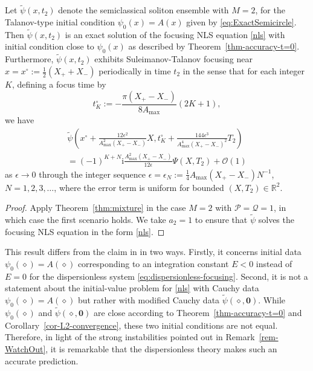 \documentclass[12pt]{amsart}
\numberwithin{equation}{section}
\newcommand{\ii}{\mathrm{i}}
\newcommand{\eps}{\epsilon}
\newcommand{\bigo}[1]{ \mathcal{O}\! \left( #1 \right) }
\begin{document}
\begin{cor}
Let $\widetilde{\psi}(x,t_2)$ denote the semiclassical soliton ensemble with $M=2$, for the Talanov-type initial condition $\psi_0(x)=A(x)$ given by \eqref{eq:ExactSemicircle}.  Then $\widetilde{\psi}(x,t_2)$ is an exact solution of the focusing NLS equation \eqref{nls} with initial condition close to $\psi_0(x)$ as described by Theorem~\ref{thm-accuracy-t=0}.  Furthermore, $\widetilde{\psi}(x,t_2)$ exhibits Suleimanov-Talanov focusing near $x=x^\circ:=\frac{1}{2}(X_++X_-)$ periodically in time $t_2$ in the sense that for each integer $K$, defining a focus time by
\begin{equation}
t_K^\circ:=-\frac{\pi(X_+-X_-)}{8A_\mathrm{max}}(2K+1),
\end{equation}
we have
\begin{multline}
\widetilde{\psi}\left(x^\circ+\frac{12\eps^2}{A_\mathrm{max}^2(X_+-X_-)}X, t_K^\circ+ \frac{144\epsilon^3}{A_\mathrm{max}^4(X_+-X_-)^2}T_2\right)\\=(-1)^{K+N} \ii \frac{A_\mathrm{max}^2(X_+-X_-)}{12\eps}\Psi(X,T_2) + \bigo{1}
\label{eq:cor.Talanov.coords}
\end{multline}
as $\eps\to 0$ through the integer sequence $\eps=\eps_N:=\frac{1}{4}A_\mathrm{max}(X_+-X_-)N^{-1}$, $N=1,2,3,\dots$, where the error term is uniform for bounded $(X,T_2)\in\mathbb{R}^2$.
\label{cor:Talanov}
\end{cor}
\begin{proof}
Apply Theorem~\ref{thm:mixture} in the case $M=2$ with $\mathcal{P}=\mathcal{Q}=1$, in which case the first scenario holds.  We take $a_2=1$ to ensure that $\widetilde{\psi}$ solves the focusing NLS equation in the form \eqref{nls}.
\end{proof}
\begin{rem}
This result differs from the claim in \cite{Suleimanov17} in two ways.  Firstly, it concerns initial data $\psi_0(\diamond)=A(\diamond)$ corresponding to an integration constant $E<0$ instead of $E=0$ for the dispersionless system \eqref{eq:dispersionless-focusing}.  Second, it is not a statement about the initial-value problem for \eqref{nls} with Cauchy data $\psi_0(\diamond)=A(\diamond)$ but rather with modified Cauchy data $\widetilde{\psi}(\diamond,\mathbf{0})$.  While $\psi_0(\diamond)$ and $\widetilde{\psi}(\diamond,\mathbf{0})$ are close according to Theorem~\ref{thm-accuracy-t=0} and Corollary~\ref{cor-L2-convergence}, these two initial conditions are not equal.  Therefore, in light of the strong instabilities pointed out in Remark~\ref{rem-WatchOut}, it is remarkable that the dispersionless theory makes such an accurate prediction.
\end{rem}
\end{document}
